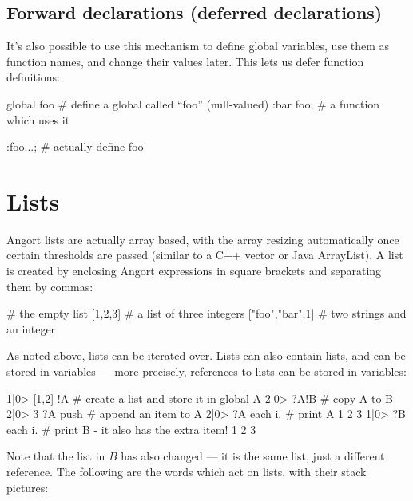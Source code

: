 \subsection{Forward declarations (deferred declarations)}
It's also possible to use this mechanism to define global variables,
use them as function names, and change their values later. This lets
us defer function definitions:
\begin{v}
global foo      # define a global called ``foo'' (null-valued)
:bar foo;       # a function which uses it

:foo...;        # actually define foo
\end{v}

\section{Lists}
\label{lists}
\indw{[|textbf}\indw{]|textbf}
Angort lists are actually array based, with the array resizing automatically
once certain thresholds are passed (similar to a C++ vector or Java ArrayList).
A list is created by enclosing Angort expressions in square
brackets and separating them by commas:
\begin{v}
[]              # the empty list
[1,2,3]         # a list of three integers
["foo","bar",1] # two strings and an integer
\end{v}
As noted above, lists can be iterated over. Lists can also contain lists,
and can be stored in variables ---  more precisely, references to lists can
be stored in variables:
\begin{v}
1|0> [1,2] !A       # create a list and store it in global A
2|0> ?A!B           # copy A to B
2|0> 3 ?A push      # append an item to A
2|0> ?A each {i.}   # print A
1
2
3
1|0> ?B each {i.}   # print B - it also has the extra item!
1
2
3
\end{v}
Note that the list in $B$ has also changed --- it is the same list,
just a different reference.
The following are the words which act on lists, with their stack pictures:
\indw{[|textbf}\indw{]|textbf}
